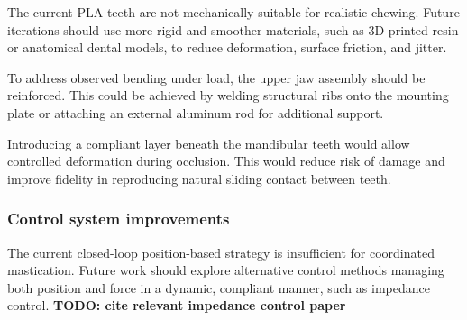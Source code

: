 The current PLA teeth are not mechanically suitable for realistic chewing. Future iterations should use more rigid and smoother materials, such as 3D-printed resin or 
anatomical dental models, to reduce deformation, surface friction, and jitter.

To address observed bending under load, the upper jaw assembly should be reinforced. This could be achieved by welding structural ribs onto the mounting plate or attaching 
an external aluminum rod for additional support.


Introducing a compliant layer beneath the mandibular teeth would allow controlled deformation during occlusion. This would reduce risk of damage and improve fidelity 
in reproducing natural sliding contact between teeth.

\subsubsection{Control system improvements}

The current closed-loop position-based strategy is insufficient for coordinated mastication. Future work should explore alternative control methods managing both position and force in a 
dynamic, compliant manner, such as impedance control. 
\textbf{TODO: cite relevant impedance control paper}

